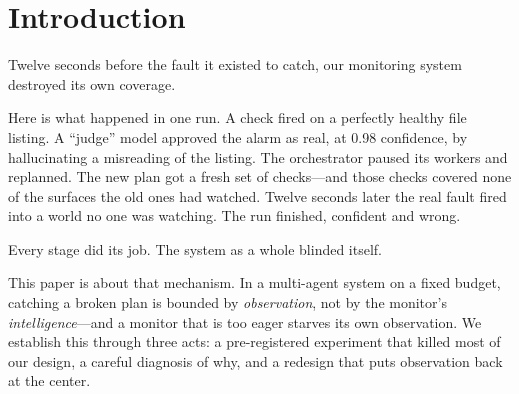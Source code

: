 \documentclass[acmsmall,screen]{acmart}
\begin{document}
\begin{abstract}
Finally, we asked whether the coupling is one model family's quirk. In a
\emph{separately and later} pre-registered live study, we swapped a different
vendor's model (GPT-5.5) into the check-writing step through a frozen seam. It is
a cheaper, higher-quality writer---yet the frozen bar failed a third time.
Offline the escape looked open (detection is flat as we cut the model's
reasoning); live it closed, because the cost lever that could clear the bar is
\emph{checklist coverage}, and coverage is what does the catching. Shortening the
checks to save money drops exactly the faults that need a specific probe---live
detection falls 5/5 to 4/5 to 3/5---and overhead never reaches 12\%. The coupling
holds on a second model family, through a new mechanism.
\end{abstract}


\maketitle

\section{Introduction}
Twelve seconds before the fault it existed to catch, our monitoring system
destroyed its own coverage.

Here is what happened in one run. A check fired on a perfectly healthy file
listing. A ``judge'' model approved the alarm as real, at 0.98 confidence, by
hallucinating a misreading of the listing. The orchestrator paused its workers
and replanned. The new plan got a fresh set of checks---and those checks
covered none of the surfaces the old ones had watched. Twelve seconds later the
real fault fired into a world no one was watching. The run finished, confident
and wrong.

Every stage did its job. The system as a whole blinded itself.

This paper is about that mechanism. In a multi-agent system on a fixed budget,
catching a broken plan is bounded by \emph{observation}, not by the monitor's
\emph{intelligence}---and a monitor that is too eager starves its own
observation. We establish this through three acts: a pre-registered experiment
that killed most of our design, a careful diagnosis of why, and a redesign that
puts observation back at the center.
\end{document}
